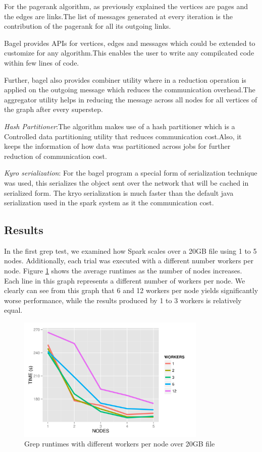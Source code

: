 \documentclass{article}
\begin{document}
For the pagerank algorithm, as previously explained the vertices are pages and the edges are links.The list of messages generated at every iteration is the contribution of the pagerank for all its outgoing links.

Bagel provides APIs for vertices, edges and messages which could be extended to customize for any algorithm.This enables the user to write any compilcated code within few lines of code.

Further, bagel also provides combiner utility where in a reduction operation is applied on the outgoing message which reduces the communication overhead.The aggregator utility helps in reducing the message across all nodes for all vertices of the graph after every superstep.

\emph{Hash Partitioner}:The algorithm makes use of a hash partitioner which is a Controlled data partitioning utility that reduces communication cost.Also, it keeps the information of how data was partitioned across jobs for further reduction of communication cost.

\emph{Kyro serialization}: For the bagel program a special form of serialization technique was used, this  serializes the object sent over the network that will be cached in serialized form. The kryo serialization is much faster than the default java serialization used in the spark system as it the communication cost.

\subsection{Results}
In the first grep test, we examined how Spark scales over a 20GB file using 1
to 5 nodes. Additionally, each trial was executed with a different number
workers per node. Figure \ref{fig:workNodeTime} shows the average runtimes as
the number of nodes increases. Each line in this graph represents a different
number of workers per node. We clearly can see from this graph that 6 and 12
workers per node yields significantly worse performance, while the results
produced by 1 to 3 workers is relatively equal.

    \begin{figure}[H]
        \centering
        \includegraphics[width=90mm]{images/workerPerNodeTimes.png}
        \caption{Grep runtimes with different workers per node over 20GB file}
        \label{fig:workNodeTime}
    \end{figure}
\end{document}
